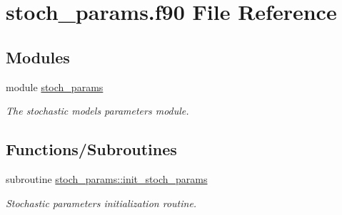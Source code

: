 \hypertarget{stoch__params_8f90}{}\section{stoch\+\_\+params.\+f90 File Reference}
\label{stoch__params_8f90}
\subsection*{Modules}
\begin{DoxyCompactItemize}
\item 
module \hyperlink{namespacestoch__params}{stoch\+\_\+params}
\begin{DoxyCompactList}\small\item\em The stochastic models parameters module. \end{DoxyCompactList}\end{DoxyCompactItemize}
\subsection*{Functions/\+Subroutines}
\begin{DoxyCompactItemize}
\item 
subroutine \hyperlink{namespacestoch__params_ae4aee571fa90316e794b67d1d404c0aa}{stoch\+\_\+params\+::init\+\_\+stoch\+\_\+params}
\begin{DoxyCompactList}\small\item\em Stochastic parameters initialization routine. \end{DoxyCompactList}\end{DoxyCompactItemize}
